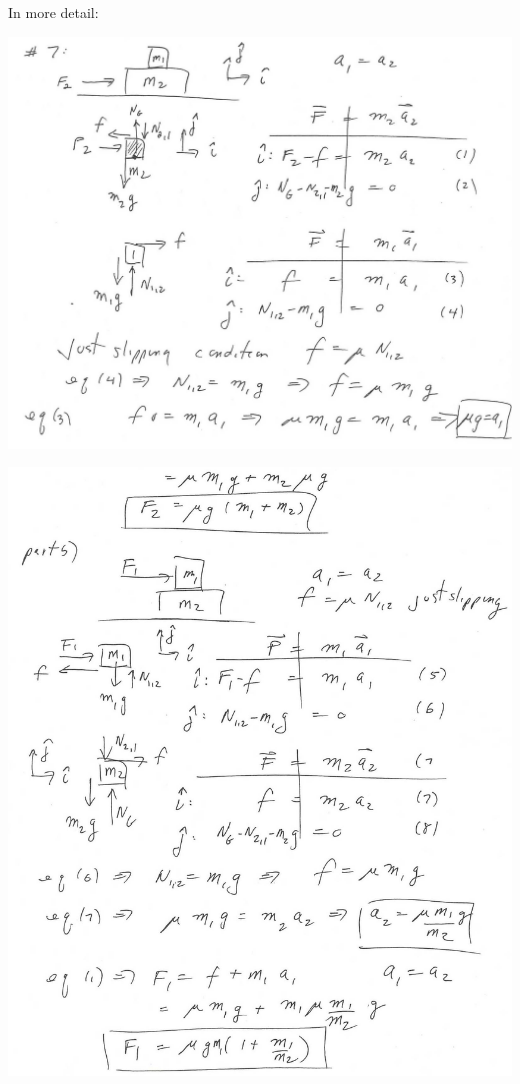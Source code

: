 \documentclass{esg8012pset}
\begin{document}
\begin{solution}
  \noindent In more detail:
  \begin{center}\includegraphics[width=\textwidth]{ps02_Solution_Problem_3_0}\end{center}
  \begin{center}\includegraphics[width=\textwidth]{ps02_Solution_Problem_3_1}\end{center}
\end{solution}
\end{document}
